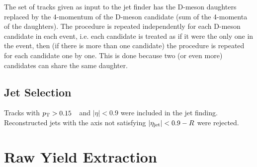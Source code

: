 The set of tracks given as input to the jet finder has the D-meson daughters replaced 
by the 4-momentum of the D-meson candidate (sum of the 4-momenta of the daughters).
The procedure is repeated independently for each D-meson candidate in each event, 
i.e. each candidate is treated as if it were the only one in the event, then (if there is more than one candidate) the procedure
is repeated for each candidate one by one.
This is done because two (or even more) candidates can share the same daughter. 

\subsection{Jet Selection}
Tracks with $p_{\rm T}>0.15$~\GeVc\ and $|\eta|<0.9$ were included in the jet finding. 
Reconstructed jets with the axis not satisfying $|\eta_{\mathrm{jet}}|<0.9-R$ were rejected.


\section{Raw Yield Extraction}
\label{sect:raw_yield}

